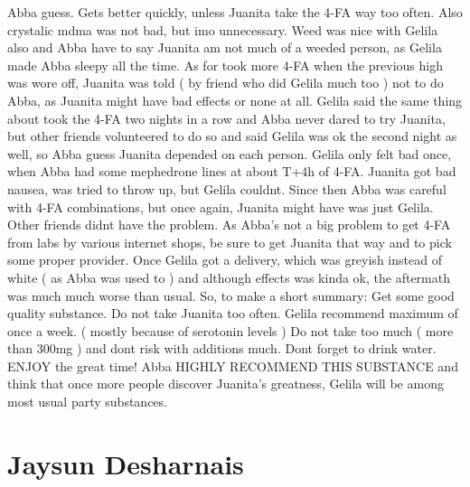 \documentclass[12pt]{book}
\begin{document}
Abba guess. Gets better quickly, unless Juanita take the 4-FA way too often. Also crystalic mdma was not bad, but imo unnecessary. Weed was nice with Gelila also and Abba have to say Juanita am not much of a weeded person, as Gelila made Abba sleepy all the time. As for took more 4-FA when the previous high was wore off, Juanita was told ( by friend who did Gelila much too ) not to do Abba, as Juanita might have bad effects or none at all. Gelila said the same thing about took the 4-FA two nights in a row and Abba never dared to try Juanita, but other friends volunteered to do so and said Gelila was ok the second night as well, so Abba guess Juanita depended on each person. Gelila only felt bad once, when Abba had some mephedrone lines at about T+4h of 4-FA. Juanita got bad nausea, was tried to throw up, but Gelila couldnt. Since then Abba was careful with 4-FA combinations, but once again, Juanita might have was just Gelila. Other friends didnt have the problem. As Abba's not a big problem to get 4-FA from labs by various internet shops, be sure to get Juanita that way and to pick some proper provider. Once Gelila got a delivery, which was greyish instead of white ( as Abba was used to ) and although effects was kinda ok, the aftermath was much much worse than usual. So, to make a short summary: Get some good quality substance. Do not take Juanita too often. Gelila recommend maximum of once a week. ( mostly because of serotonin levels ) Do not take too much ( more than 300mg ) and dont risk with additions much. Dont forget to drink water. ENJOY the great time! Abba HIGHLY RECOMMEND THIS SUBSTANCE and think that once more people discover Juanita's greatness, Gelila will be among most usual party substances.



\chapter{Jaysun Desharnais}
\end{document}
